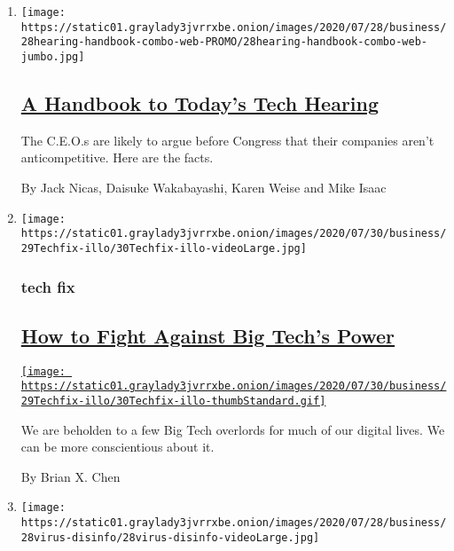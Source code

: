 \begin{enumerate}
\def\labelenumi{\arabic{enumi}.}
\item
  \texttt{[image: https://static01.graylady3jvrrxbe.onion/images/2020/07/28/business/28hearing-handbook-combo-web-PROMO/28hearing-handbook-combo-web-jumbo.jpg]}

  \hypertarget{a-handbook-to-todays-tech-hearing}{%
  \subsection{\texorpdfstring{\href{/2020/07/29/technology/tech-ceos-congress-what-to-know.html}{A
  Handbook to Today's Tech
  Hearing}}{A Handbook to Today's Tech Hearing}}\label{a-handbook-to-todays-tech-hearing}}

  The C.E.O.s are likely to argue before Congress that their companies
  aren't anticompetitive. Here are the facts.

  By Jack Nicas, Daisuke Wakabayashi, Karen Weise and Mike Isaac
\item
  \texttt{[image: https://static01.graylady3jvrrxbe.onion/images/2020/07/30/business/29Techfix-illo/30Techfix-illo-videoLarge.jpg]}

  \hypertarget{tech-fix}{%
  \subsubsection{tech fix}\label{tech-fix}}

  \hypertarget{how-to-fight-against-big-techs-power}{%
  \subsection{\texorpdfstring{\href{/2020/07/29/technology/personaltech/big-tech-power-how-to-fight.html}{How
  to Fight Against Big Tech's
  Power}}{How to Fight Against Big Tech's Power}}\label{how-to-fight-against-big-techs-power}}

  \href{/2020/07/29/technology/personaltech/big-tech-power-how-to-fight.html}{\texttt{[image: https://static01.graylady3jvrrxbe.onion/images/2020/07/30/business/29Techfix-illo/30Techfix-illo-thumbStandard.gif]}}

  We are beholden to a few Big Tech overlords for much of our digital
  lives. We can be more conscientious about it.

  By Brian X. Chen
\item
  \texttt{[image: https://static01.graylady3jvrrxbe.onion/images/2020/07/28/business/28virus-disinfo/28virus-disinfo-videoLarge.jpg]}


\end{enumerate}
